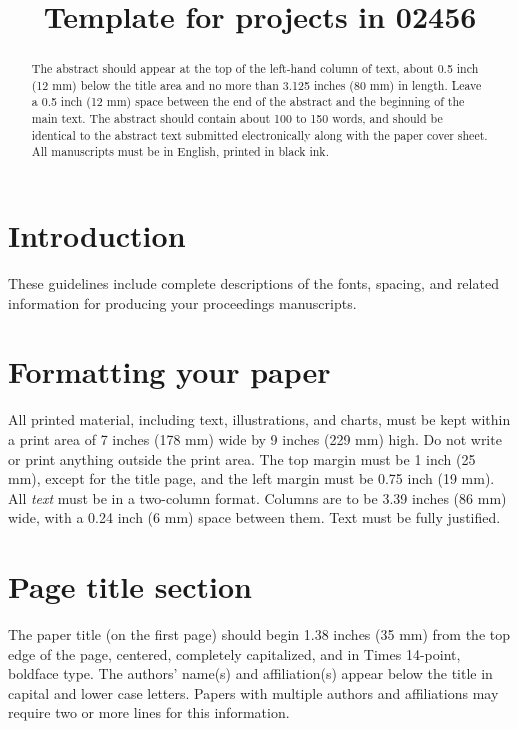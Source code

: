 \documentclass{article}
\title{Template for projects in 02456}
\begin{document}
\maketitle

\begin{abstract}
  The abstract should appear at the top of the left-hand column of text, about 0.5 inch (12 mm) below the title area and no more than 3.125 inches (80 mm) in length. Leave a 0.5 inch (12 mm) space between the end of the abstract and the beginning of the main text. The abstract should contain about 100 to 150 words, and should be identical to the abstract text submitted electronically along with the paper cover sheet. All manuscripts must be in English, printed in black ink.
\end{abstract}

\section{Introduction}
\label{sec:intro}

These guidelines include complete descriptions of the fonts, spacing, and related information for producing your proceedings manuscripts.

\section{Formatting your paper}
\label{sec:format}

All printed material, including text, illustrations, and charts, must be kept within a print area of 7 inches (178 mm) wide by 9 inches (229 mm) high. Do not write or print anything outside the print area. The top margin must be 1 inch (25 mm), except for the title page, and the left margin must be 0.75 inch (19 mm). All \emph{text} must be in a two-column format. Columns are to be 3.39 inches (86 mm) wide, with a 0.24 inch (6 mm) space between them. Text must be fully justified.

\section{Page title section}
\label{sec:pagestyle}

The paper title (on the first page) should begin 1.38 inches (35 mm) from the top edge of the page, centered, completely capitalized, and in Times 14-point, boldface type. The authors' name(s) and affiliation(s) appear below the title in capital and lower case letters. Papers with multiple authors and affiliations may require two or more lines for this information.
\end{document}
